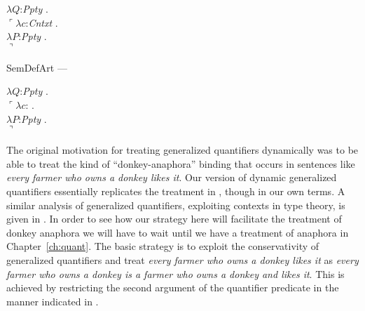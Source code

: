 \begin{ex}
\begin{subex}
  $\lambda Q$:\textit{Ppty} . \\
  \hspace*{1em}$\ulcorner\lambda c$:\textit{Cntxt} . \\
  \hspace*{2em}$\lambda P$:\textit{Ppty} . \\
  \hspace*{3em}$\urcorner$

  


  
\item SemDefArt ---

  $\lambda Q$:\textit{Ppty} . \\
  \hspace*{1em}$\ulcorner\lambda c$: . \\
  \hspace*{2em}$\lambda P$:\textit{Ppty} . \\
  \hspace*{3em}$\urcorner$

 
\end{subex} 
\label{ex:dynqconstr}   
\end{ex}



The original motivation for treating generalized quantifiers
dynamically was to be able to treat the kind of ``donkey-anaphora''
binding that occurs in sentences like \textit{every farmer who owns a
  donkey likes it}.  Our version of dynamic generalized quantifiers
essentially replicates the treatment in \cite{Chierchia1995}, though
in our own terms.  A similar analysis of generalized quantifiers,
exploiting contexts in type theory, is given in
\cite{Fernando2001}. In order to see how our strategy here will
facilitate the treatment of donkey anaphora we will have to wait until
we have a treatment of anaphora in Chapter~\ref{ch:quant}.    The
basic strategy is to exploit the conservativity of generalized
quantifiers and treat \textit{every farmer who owns a donkey likes it}
as \textit{every farmer who owns a donkey is a farmer who owns a
  donkey and likes it}.  This is achieved by restricting the second
argument of the quantifier predicate in the manner indicated in \preveg{}.


